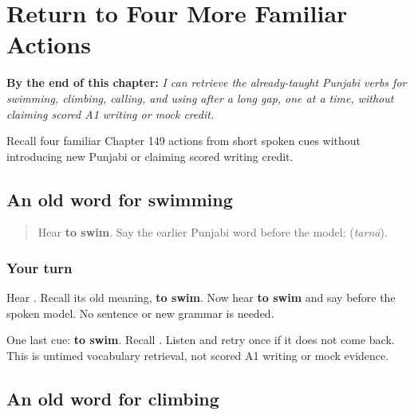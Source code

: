 
\chapter{Return to Four More Familiar Actions}
\label{ch:pa-four-more-familiar-actions}

\begin{chapteropening}
\textbf{By the end of this chapter:} \emph{I can retrieve the already-taught Punjabi verbs for swimming, climbing, calling, and using after a long gap, one at a time, without claiming scored A1 writing or mock credit.}

Recall four familiar Chapter 149 actions from short spoken cues without introducing new Punjabi or claiming scored writing credit.
\end{chapteropening}

\section[\texorpdfstring{\pa{ਤਰਨਾ} (tarnā)}{ਤਰਨਾ (tarnā)}]{An old word for swimming}

\label{lesson:PA-R161-swim-again}



\begin{quote}
Hear \textbf{to swim}. Say the earlier Punjabi word before the model: \textbf{} (\emph{tarnā}).
\end{quote}

\subsection*{Your turn}
Hear \textbf{}. Recall its old meaning, \textbf{to swim}. Now hear \textbf{to swim} and say \textbf{} before the spoken model. No sentence or new grammar is needed.

\begin{tcolorbox}[breakable,colback=teal!4,colframe=teal!35!black,title={Before you move on}]
One last cue: \textbf{to swim}. Recall \textbf{}. Listen and retry once if it does not come back. This is untimed vocabulary retrieval, not scored A1 writing or mock evidence.
\end{tcolorbox}
\section[\texorpdfstring{\pa{ਚੜ੍ਹਨਾ} (caṛhnā)}{ਚੜ੍ਹਨਾ (caṛhnā)}]{An old word for climbing}

